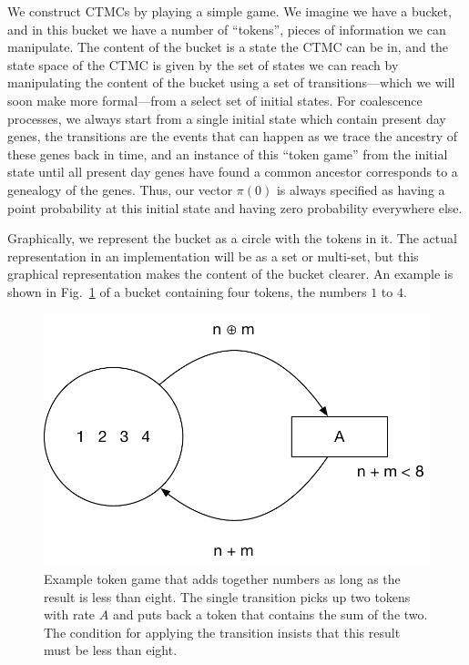 \documentclass[graybox]{svmult}
\begin{document}
We construct CTMCs by playing a simple game. We imagine we have a bucket, and in this bucket we have a number of ``tokens'', pieces of information we can manipulate. The content of the bucket is a state the CTMC can be in, and the state space of the CTMC is given by the set of states we can reach by manipulating the content of the bucket using a set of transitions---which we will soon make more formal---from a select set of initial states. For coalescence processes, we always start from a single initial state which contain present day genes, the transitions are the events that can happen as we trace the ancestry of these genes back in time, and an instance of this ``token game'' from the initial state until all present day genes have found a common ancestor corresponds to a genealogy of the genes. Thus, our vector $\pi(0)$ is always specified as having a point probability at this initial state and having zero probability everywhere else.

Graphically, we represent the bucket as a circle with the tokens in it. The actual representation in an implementation will be as a set or multi-set, but this graphical representation makes the content of the bucket clearer. An example is shown in Fig.~\ref{fig:example-CPN} of a bucket containing four tokens, the numbers $1$ to $4$.

\begin{figure}[h]
\sidecaption[t]
\includegraphics[scale=.45]{figures/example-CPN}
\caption{Example token game that adds together numbers as long as the result is less than eight. The single transition picks up two tokens with rate $A$ and puts back a token that contains the sum of the two. The condition for applying the transition insists that this result must be less than eight.}
\label{fig:example-CPN}
\end{figure}
\end{document}
